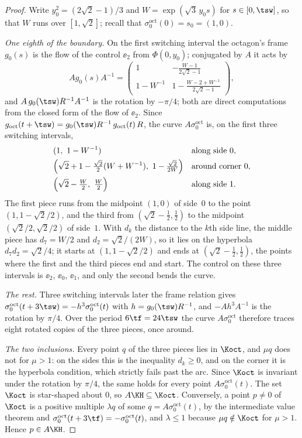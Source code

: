 \begin{proof}
Write $y_0^2=(2\sqrt2-1)/3$ and $W=\exp(\sqrt3\,y_0 s)$ for $s\in[0,\tsw]$, so that $W$ runs over
$[1,\sqrt2]$; recall that $\sigma^{\mathrm{oct}}_0(0)=s_0=(1,0)$.

\emph{One eighth of the boundary.} On the first switching interval the octagon's frame
$g_0(s)$ is the flow of the control $\ee_2$ from $\Phi(0,y_0)$; conjugated by $A$ it acts by
\[
 Ag_0(s)A^{-1}=\begin{pmatrix}1&-\frac{W-1}{2\sqrt2-1}\\[0.5ex]
 1-W^{-1}&1-\frac{W-2+W^{-1}}{2\sqrt2-1}\end{pmatrix},
\]
and $A\,g_0(\tsw)R^{-1}A^{-1}$ is the rotation by $-\pi/4$; both are direct computations from
the closed form of the flow of $\ee_2$. Since $g_{\mathrm{oct}}(t+\tsw)=g_0(\tsw)R^{-1}\,g_{\mathrm{oct}}(t)\,R$,
the curve $A\sigma^{\mathrm{oct}}_0$ is, on the first three switching intervals,
\begin{align*}
 &(1,\ 1-W^{-1}) &&\text{along side $0$},\\
 &\Bigl(\sqrt2+1-\tfrac{\sqrt2}{2}(W+W^{-1}),\ 1-\tfrac{\sqrt2}{2W}\Bigr)
  &&\text{around corner $0$},\\
 &\Bigl(\sqrt2-\tfrac W2,\ \tfrac W2\Bigr) &&\text{along side $1$}.
\end{align*}
The first piece runs from the midpoint $(1,0)$ of side~$0$ to the point $(1,1-\sqrt2/2)$, and the
third from $(\sqrt2-\tfrac12,\tfrac12)$ to the midpoint $(\sqrt2/2,\sqrt2/2)$ of side~$1$.
With $d_k$ the distance to the $k$th side line, the middle piece has $d_7=W/2$ and
$d_2=\sqrt2/(2W)$, so it lies on the hyperbola $d_7d_2=\sqrt2/4$; it starts at
$(1,1-\sqrt2/2)$ and ends at $(\sqrt2-\tfrac12,\tfrac12)$, the points where the first and the
third pieces end and start. The control on these three intervals is $\ee_2$, $\ee_0$, $\ee_1$,
and only the second bends the curve.

\emph{The rest.} Three switching intervals later the frame relation gives
$\sigma^{\mathrm{oct}}_0(t+3\tsw)=-h^3\sigma^{\mathrm{oct}}_0(t)$ with $h=g_0(\tsw)R^{-1}$, and
$-Ah^3A^{-1}$ is the rotation by $\pi/4$. Over the period
$6\tf=24\tsw$ the curve $A\sigma^{\mathrm{oct}}_0$ therefore traces eight rotated copies of the
three pieces, once around.

\emph{The two inclusions.} Every point $q$ of the three pieces lies in $\Koct$, and $\mu q$ does
not for $\mu>1$: on the sides this is the inequality $d_k\ge0$, and on the corner it is the
hyperbola condition, which strictly fails past the arc. Since $\Koct$ is invariant under the
rotation by $\pi/4$, the same holds for every point $A\sigma^{\mathrm{oct}}_0(t)$. The set $\Koct$ is star-shaped about $0$, so $A\KH\subseteq\Koct$.
Conversely, a point $p\ne0$ of $\Koct$ is a positive multiple $\lambda q$ of some
$q=A\sigma^{\mathrm{oct}}_0(t)$, by the intermediate value theorem and
$\sigma^{\mathrm{oct}}_0(t+3\tf)=-\sigma^{\mathrm{oct}}_0(t)$, and $\lambda\le1$ because
$\mu q\notin\Koct$ for $\mu>1$. Hence $p\in A\KH$.
\end{proof}

